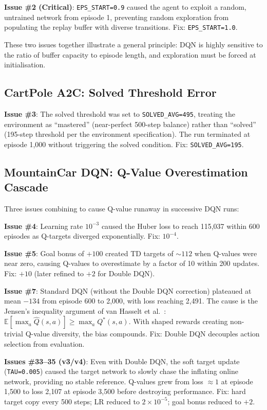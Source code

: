 \documentclass[a4paper,12pt]{article}
\begin{document}
\textbf{Issue \#2 (Critical)}: \texttt{EPS\_START=0.9} caused the agent to exploit a random, untrained network from episode 1, preventing random exploration from populating the replay buffer with diverse transitions. Fix: \texttt{EPS\_START=1.0}.

These two issues together illustrate a general principle: DQN is highly sensitive to the ratio of buffer capacity to episode length, and exploration must be forced at initialisation.

\subsection{CartPole A2C: Solved Threshold Error}

\textbf{Issue \#3}: The solved threshold was set to \texttt{SOLVED\_AVG=495}, treating the environment as ``mastered'' (near-perfect 500-step balance) rather than ``solved'' (195-step threshold per the environment specification). The run terminated at episode 1,000 without triggering the solved condition. Fix: \texttt{SOLVED\_AVG=195}.

\subsection{MountainCar DQN: Q-Value Overestimation Cascade}
\label{sec:dqn_bugs}

Three issues combining to cause Q-value runaway in successive DQN runs:

\textbf{Issue \#4}: Learning rate $10^{-3}$ caused the Huber loss to reach 115,037 within 600 episodes as Q-targets diverged exponentially. Fix: $10^{-4}$.

\textbf{Issue \#5}: Goal bonus of $+100$ created TD targets of $\sim112$ when Q-values were near zero, causing Q-values to overestimate by a factor of 10 within 200 updates. Fix: $+10$ (later refined to $+2$ for Double DQN).

\textbf{Issue \#7}: Standard DQN (without the Double DQN correction) plateaued at mean $-134$ from episode 600 to 2,000, with loss reaching 2,491. The cause is the Jensen's inequality argument of van Hasselt et al.\ \cite{van2016deep}: $\mathbb{E}[\max_a \hat{Q}(s,a)] \geq \max_a Q^*(s,a)$. With shaped rewards creating non-trivial Q-value diversity, the bias compounds. Fix: Double DQN decouples action selection from evaluation.

\textbf{Issues \#33--35 (v3/v4)}: Even with Double DQN, the soft target update (\texttt{TAU=0.005}) caused the target network to slowly chase the inflating online network, providing no stable reference. Q-values grew from loss $\approx 1$ at episode 1,500 to loss 2,107 at episode 3,500 before destroying performance. Fix: hard target copy every 500 steps; LR reduced to $2\times10^{-5}$; goal bonus reduced to $+2$.
\end{document}
